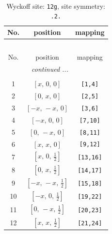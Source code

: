 \documentclass[fleqn,8pt]{jsarticle}
\begin{document}
\renewcommand{\arraystretch}{1.2}
\begin{longtable}{ccc}
\caption{Wyckoff site: {\tt 12g}, site symmetry: {\tt .2.}}
 \\
 \hline \hline
No. & position & mapping \\ \hline \endfirsthead

\multicolumn{2}{l}{\tablename\ \thetable{}} \\
 \hline \hline
No. & position & mapping \\ \hline \endhead

 \hline \hline
\multicolumn{2}{r}{\footnotesize\it continued ...} \\ \endfoot

 \hline \hline
\multicolumn{2}{r}{} \\ \endlastfoot

1 & $\left[ x,\, 0,\, 0 \right]$ & {\tt [1,4]} \\ \hline
2 & $\left[ 0,\, x,\, 0 \right]$ & {\tt [2,5]} \\ \hline
3 & $\left[ - x,\, - x,\, 0 \right]$ & {\tt [3,6]} \\ \hline
4 & $\left[ - x,\, 0,\, 0 \right]$ & {\tt [7,10]} \\ \hline
5 & $\left[ 0,\, - x,\, 0 \right]$ & {\tt [8,11]} \\ \hline
6 & $\left[ x,\, x,\, 0 \right]$ & {\tt [9,12]} \\ \hline
7 & $\left[ x,\, 0,\, \frac{1}{2} \right]$ & {\tt [13,16]} \\ \hline
8 & $\left[ 0,\, x,\, \frac{1}{2} \right]$ & {\tt [14,17]} \\ \hline
9 & $\left[ - x,\, - x,\, \frac{1}{2} \right]$ & {\tt [15,18]} \\ \hline
10 & $\left[ - x,\, 0,\, \frac{1}{2} \right]$ & {\tt [19,22]} \\ \hline
11 & $\left[ 0,\, - x,\, \frac{1}{2} \right]$ & {\tt [20,23]} \\ \hline
12 & $\left[ x,\, x,\, \frac{1}{2} \right]$ & {\tt [21,24]} \\
\end{longtable}
\renewcommand{\arraystretch}{1.2}
\end{document}
